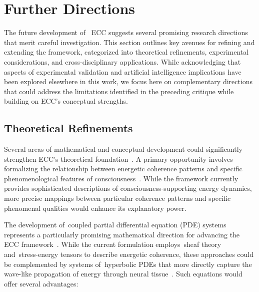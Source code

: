 \section{Further Directions}

The future development of~ ECC suggests several promising research directions that merit careful investigation. This section outlines key avenues for refining and extending the framework, categorized into theoretical refinements, experimental considerations, and cross-disciplinary applications. While acknowledging that aspects of experimental validation and artificial intelligence implications have been explored elsewhere in this work, we focus here on complementary directions that could address the limitations identified in the preceding critique while building on ECC's conceptual strengths.

\subsection*{Theoretical Refinements}

Several areas of mathematical and conceptual development could significantly strengthen ECC's theoretical foundation~\cite{thompson2014waking, varela2016embodied}. A primary opportunity involves formalizing the relationship between energetic coherence patterns and specific phenomenological features of consciousness~\cite{zahavi2014self, koch2019feeling}. While the framework currently provides sophisticated descriptions of consciousness-supporting energy dynamics, more precise mappings between particular coherence patterns and specific phenomenal qualities would enhance its explanatory power.

The development of~coupled partial differential equation (PDE) systems represents a particularly promising mathematical direction for advancing the ECC framework~\cite{kelso2016dynamic, bosl2025dynamical}. While the current formulation employs~sheaf theory and~stress-energy tensors to describe energetic coherence, these approaches could be complemented by systems of~hyperbolic PDEs that more directly capture the wave-like propagation of energy through neural tissue~\cite{pinotsis2023vivo, deacon2013incomplete}. Such equations would offer several advantages:

